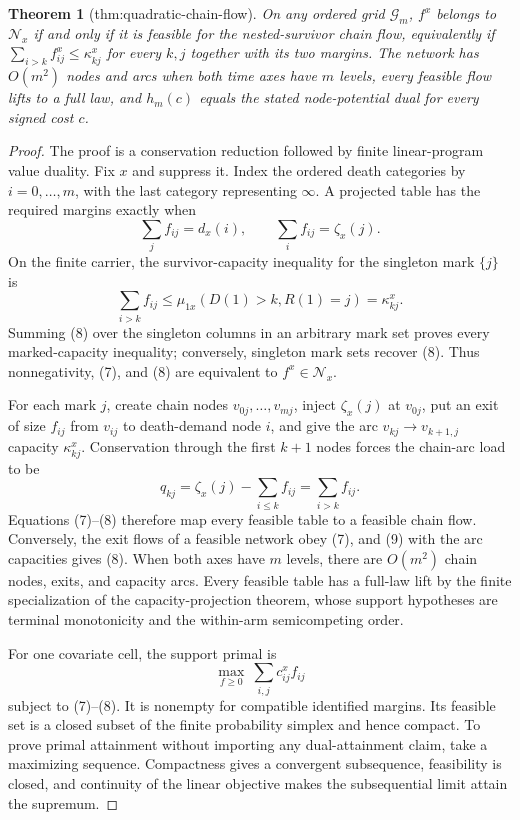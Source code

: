 \documentclass{article}
\newtheorem{theorem}{Theorem}
\begin{document}
\begin{theorem}[thm:quadratic-chain-flow]\label{thm:quadratic-chain-flow}
On any ordered grid \(\mathcal G_m\), \(f^x\) belongs to \(\mathcal N_x\) if and only if it is feasible for the nested-survivor chain flow, equivalently if \(\sum_{i>k}f^x_{ij}\le\kappa^x_{kj}\) for every \(k,j\) together with its two margins. The network has \(O(m^2)\) nodes and arcs when both time axes have \(m\) levels, every feasible flow lifts to a full law, and \(h_m(c)\) equals the stated node-potential dual for every signed cost \(c\).
\end{theorem}
\begin{proof}
The proof is a conservation reduction followed by finite linear-program value duality.  Fix \(x\) and suppress it.  Index the ordered death categories by \(i=0,\ldots,m\), with the last category representing \(\infty\).  A projected table has the required margins exactly when
\[
\sum_j f_{ij}=d_x(i),
\qquad
\sum_i f_{ij}=\zeta_x(j).                                           \tag{7}
\]
On the finite carrier, the survivor-capacity inequality for the singleton mark \(\{j\}\) is
\[
\sum_{i>k}f_{ij}\leq
\mu_{1x}(D(1)>k,R(1)=j)=\kappa^x_{kj}.                              \tag{8}
\]
Summing (8) over the singleton columns in an arbitrary mark set proves every marked-capacity inequality; conversely, singleton mark sets recover (8).  Thus nonnegativity, (7), and (8) are equivalent to \(f^x\in\mathcal N_x\).

For each mark \(j\), create chain nodes \(v_{0j},\ldots,v_{mj}\), inject \(\zeta_x(j)\) at \(v_{0j}\), put an exit of size \(f_{ij}\) from \(v_{ij}\) to death-demand node \(i\), and give the arc \(v_{kj}\to v_{k+1,j}\) capacity \(\kappa^x_{kj}\).  Conservation through the first \(k+1\) nodes forces the chain-arc load to be
\[
q_{kj}=\zeta_x(j)-\sum_{i\leq k}f_{ij}
=\sum_{i>k}f_{ij}.                                                    \tag{9}
\]
Equations (7)--(8) therefore map every feasible table to a feasible chain flow.  Conversely, the exit flows of a feasible network obey (7), and (9) with the arc capacities gives (8).  When both axes have \(m\) levels, there are \(O(m^2)\) chain nodes, exits, and capacity arcs.  Every feasible table has a full-law lift by the finite specialization of the capacity-projection theorem, whose support hypotheses are terminal monotonicity and the within-arm semicompeting order.

For one covariate cell, the support primal is
\[
\max_{f\geq0}\ \sum_{i,j}c^x_{ij}f_{ij}
\]
subject to (7)--(8).  It is nonempty for compatible identified margins.  Its feasible set is a closed subset of the finite probability simplex and hence compact.  To prove primal attainment without importing any dual-attainment claim, take a maximizing sequence.  Compactness gives a convergent subsequence, feasibility is closed, and continuity of the linear objective makes the subsequential limit attain the supremum.


\end{proof}
\end{document}
